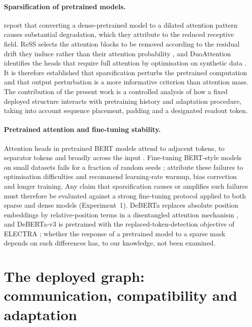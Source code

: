 \documentclass[10pt]{article}
\begin{document}
\paragraph{Sparsification of pretrained models.} \citet{wei2026rat} report that converting a dense-pretrained model to a dilated attention pattern causes substantial degradation, which they attribute to the reduced receptive field. ReSS selects the attention blocks to be removed according to the residual drift they induce rather than their attention probability \citep{kim2026ress}, and DuoAttention identifies the heads that require full attention by optimisation on synthetic data \citep{xiao2024duoattention}. It is therefore established that sparsification perturbs the pretrained computation and that output perturbation is a more informative criterion than attention mass. The contribution of the present work is a controlled analysis of how a fixed deployed structure interacts with pretraining history and adaptation procedure, taking into account sequence placement, padding and a designated readout token.

\paragraph{Pretrained attention and fine-tuning stability.} Attention heads in pretrained BERT models attend to adjacent tokens, to separator tokens and broadly across the input \citep{clark2019does,kovaleva2019revealing}. Fine-tuning BERT-style models on small datasets fails for a fraction of random seeds \citep{devlin2019bert,dodge2020fine}; \citet{mosbach2021stability} attribute these failures to optimisation difficulties and recommend learning-rate warmup, bias correction and longer training. Any claim that sparsification causes or amplifies such failures must therefore be evaluated against a strong fine-tuning protocol applied to both sparse and dense models (Experiment~1). DeBERTa replaces absolute position embeddings by relative-position terms in a disentangled attention mechanism \citep{he2021deberta}, and DeBERTa-v3 is pretrained with the replaced-token-detection objective of ELECTRA \citep{clark2020electra,he2023debertav3}; whether the response of a pretrained model to a sparse mask depends on such differences has, to our knowledge, not been examined.

\section{The deployed graph: communication, compatibility and adaptation}
\label{sec:framework}
\end{document}
